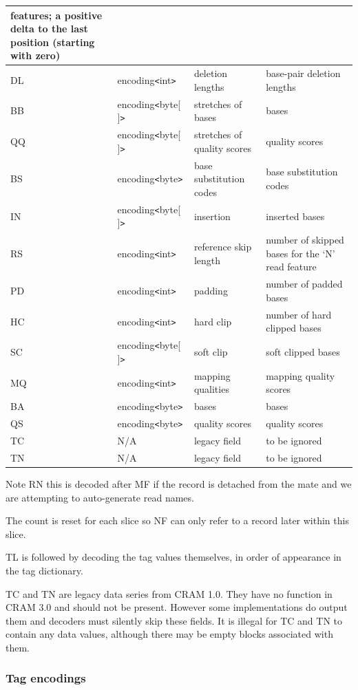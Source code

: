 \documentclass[a4paper]{article}
\begin{document}
\begin{threeparttable}[t]
\begin{tabular}{|l|l|>{\raggedright}p{100pt}|>{\raggedright}p{220pt}|}
features; a positive delta to the last position (starting with zero)\tabularnewline
\hline
DL & encoding\texttt{<}int\texttt{>} & deletion lengths & base-pair deletion lengths\tabularnewline
\hline
BB & encoding\texttt{<}byte[ ]\texttt{>} & stretches of bases & bases\tabularnewline
\hline
QQ & encoding\texttt{<}byte[ ]\texttt{>} & stretches of quality scores & quality scores\tabularnewline
\hline
BS & encoding\texttt{<}byte\texttt{>} & base substitution codes & base substitution
codes\tabularnewline
\hline
IN & encoding\texttt{<}byte[ ]\texttt{>} & insertion & inserted bases\tabularnewline
\hline
RS & encoding\texttt{<}int\texttt{>} & reference skip length & number of skipped 
bases for the `N' read feature\tabularnewline
\hline
PD & encoding\texttt{<}int\texttt{>} & padding & number of padded bases\tabularnewline
\hline
HC & encoding\texttt{<}int\texttt{>} & hard clip & number of hard clipped bases\tabularnewline
\hline
SC & encoding\texttt{<}byte[ ]\texttt{>} & soft clip & soft clipped bases\tabularnewline
\hline
MQ & encoding\texttt{<}int\texttt{>} & mapping qualities & mapping quality scores\tabularnewline
\hline
BA & encoding\texttt{<}byte\texttt{>} & bases & bases\tabularnewline
\hline
QS & encoding\texttt{<}byte\texttt{>} & quality scores & quality scores\tabularnewline
\hline
TC\tnote{d} & N/A & legacy field & to be ignored\tabularnewline
\hline
TN\tnote{d} & N/A & legacy field & to be ignored\tabularnewline
\end{tabular}

\begin{tablenotes}
\item[a] Note RN this is decoded after MF if the record is detached from the mate and we are attempting to auto-generate read names.
\item[b] The count is reset for each slice so NF can only refer to a record later within this slice.
\item[c] TL is followed by decoding the tag values themselves, in order of appearance in the tag dictionary.
\item[d] TC and TN are legacy data series from CRAM 1.0.
They have no function in CRAM 3.0 and should not be present.
However some implementations do output them and decoders must silently skip these fields.
It is illegal for TC and TN to contain any data values, although there
may be empty blocks associated with them.
\end{tablenotes}
\end{threeparttable}

\subsubsection*{Tag encodings}
\label{subsubsec:tags}
\end{document}

